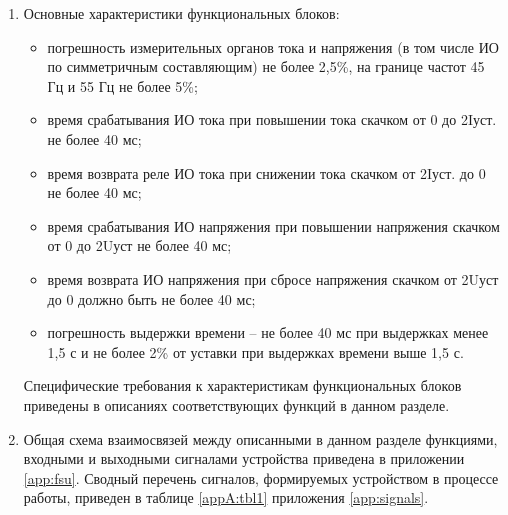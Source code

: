 \begin{enumerate}[label=\arabic{section}.\arabic{subsection}.\arabic*, labelsep=4pt, leftmargin=0pt, itemindent=57pt]
\item
Основные характеристики функциональных блоков:
\begin{itemize}
    \item погрешность измерительных органов тока и напряжения (в том числе ИО по симметричным составляющим) не более 2,5\%, на границе частот 45 Гц и 55 Гц не более 5\%;
    \item время срабатывания ИО тока при повышении тока скачком от 0 до 2Iуст. не более 40 мс;
    \item время возврата реле ИО тока при снижении тока скачком от 2Iуст. до 0 не более 40 мс;
    \item время срабатывания ИО напряжения при повышении напряжения скачком от 0 до 2Uуст не более 40 мс;
    \item время возврата ИО напряжения при сбросе напряжения скачком от 2Uуст до 0 должно быть не более 40 мс; 
    \item погрешность выдержки времени -- не более 40 мс при выдержках менее 1,5 с и не более 2\% от уставки при выдержках времени выше 1,5 с.
\end{itemize}
Специфические требования к характеристикам функциональных блоков приведены в описаниях соответствующих функций в данном разделе.

\item
Общая схема взаимосвязей между описанными в данном разделе функциями, входными и выходными сигналами устройства приведена в приложении \ref{app:fsu}.
Сводный перечень сигналов, формируемых устройством в процессе работы, приведен в таблице \ref{appA:tbl1} приложения \ref{app:signals}.

\end{enumerate}